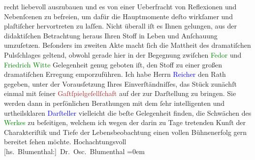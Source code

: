                recht liebevoll auszubauen und es von einer Ueberfracht von Reflexionen und
               Nebenſcenen zu befreien, um dafür die Hauptmomente deſto wirkſamer und plaſtiſcher
               hervortreten zu laſſen. Nicht überall iſt es Ihnen gelungen, aus der didaktiſchen
               Betrachtung heraus Ihren Stoff in Leben und Anſchauung umzuſetzen. Beſonders im
               zweiten Akte macht ſich die Mattheit des dramatiſchen Pulsſchlages geltend, obwohl
               gerade hier in der Begegnung zwiſchen \textcolor{green}{Fedor}{} und \textcolor{green}{Friedrich Witte}{} Gelegenheit genug geboten iſt, den Stoff zu einer großen
               dramatiſchen Erregung emporzuführen.\pend
           \pstart
           {\pb}Ich habe Herrn \textcolor{blue}{Reicher}{}\ledrightnote{\textcolor{blue}{Emanuel Reicher}} den Rath gegeben, unter der Vorausſetzung Ihres
               Einverſtändniſſes, das Stück zunächſt einmal mit ſeiner \textcolor{brown}{Gaſtſpielgeſellſchaft}{}\ledrightnote{\textcolor{brown}{Emanuel Reicher’s Deutsche Gastspielgesellschaft}} auf der \label{K_L00052_1v}\label{K_L00052_1h} zur Darſtellung zu
               bringen. Sie werden dann in perſönlichen Berathungen mit dem ſehr intelligenten und
               urtheilsklaren \textcolor{blue}{Darſteller}{}
               vielleicht die beſte Gelegenheit finden, die Schwächen des \textcolor{green}{Werkes}{} zu beſeitigen, welchem ich wegen der
               darin zu Tage tretenden Kunſt der Charakteriſtik und Tiefe der Lebensbeobachtung
               einen vollen Bühnenerfolg gern bereitet ſehen möchte.\pend
           \pstart
           Hochachtungsvoll{\\[\baselineskip]}\spacefill\mbox{{[}hs. Blumenthal:{]} Dr. Osc. Blumenthal}\pend
           \leftskip=0em{}\endnumbering{}  
      